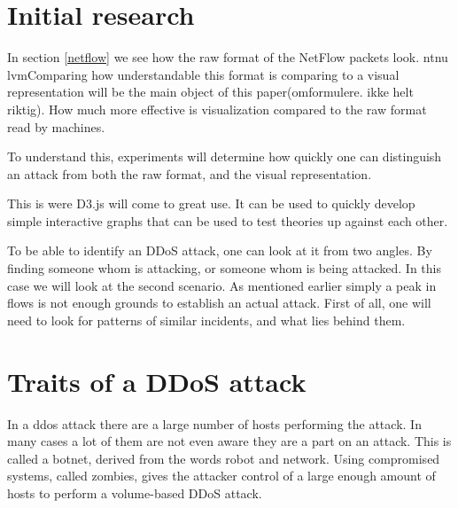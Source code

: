 \section{Initial research}
In section \ref{netflow} we see how the raw format of the NetFlow packets look. \gls{ntnu} \gls{lvm}Comparing how understandable this format is comparing to a visual representation will be the main object of this paper(omformulere. ikke helt riktig). How much more effective is visualization compared to the raw format read by machines. 

To understand this, experiments will determine how quickly one can distinguish an attack from both the raw format, and the visual representation. 

This is were D3.js will come to great use. It can be used to quickly develop simple interactive graphs that can be used to test theories up against each other.

To be able to identify an DDoS attack, one can look at it from two angles. By finding someone whom is attacking, or someone whom is being attacked. In this case we will look at the second scenario. As mentioned earlier simply a peak in flows is not enough grounds to establish an actual attack. First of all, one will need to look for patterns of similar incidents, and what lies behind them.

\newpage

\section{Traits of a DDoS attack}
In a \gls{ddos} attack there are a large number of hosts performing the attack. In many cases a lot of them are not even aware they are a part on an attack. This is called a botnet, derived from the words robot and network. Using compromised systems, called zombies, gives the attacker control of a large enough amount of hosts to perform a volume-based DDoS attack. 

